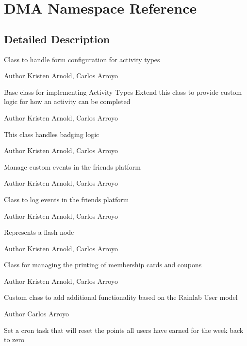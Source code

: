 \hypertarget{namespaceDMA}{\section{D\+M\+A Namespace Reference}
\label{namespaceDMA}
}


\subsection{Detailed Description}
Class to handle form configuration for activity types

\begin{DoxyAuthor}{Author}
Kristen Arnold, Carlos Arroyo
\end{DoxyAuthor}
Base class for implementing Activity Types Extend this class to provide custom logic for how an activity can be completed

\begin{DoxyAuthor}{Author}
Kristen Arnold, Carlos Arroyo
\end{DoxyAuthor}
This class handles badging logic

\begin{DoxyAuthor}{Author}
Kristen Arnold, Carlos Arroyo
\end{DoxyAuthor}
Manage custom events in the friends platform

\begin{DoxyAuthor}{Author}
Kristen Arnold, Carlos Arroyo
\end{DoxyAuthor}
Class to log events in the friends platform

\begin{DoxyAuthor}{Author}
Kristen Arnold, Carlos Arroyo
\end{DoxyAuthor}
Represents a flash node

\begin{DoxyAuthor}{Author}
Kristen Arnold, Carlos Arroyo
\end{DoxyAuthor}
Class for managing the printing of membership cards and coupons  \begin{DoxyAuthor}{Author}
Kristen Arnold, Carlos Arroyo
\end{DoxyAuthor}
Custom class to add additional functionality based on the Rainlab User model

\begin{DoxyAuthor}{Author}
Carlos Arroyo
\end{DoxyAuthor}
Set a cron task that will reset the points all users have earned for the week back to zero

